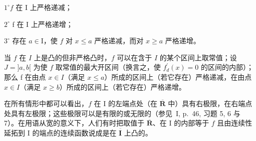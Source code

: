 \(1^{\circ} f\) 在 I 上严格递减；

\(2^{\circ}\) f 在 I 上严格递增；

\(3^{\circ}\) 存在 \(a \in \mathrm{I}\)，使 \(f\) 对 \(x \leqslant a\) 严格递减，而对 \(x \geqslant a\) 严格递增。

当 \(f\) 在 \(I\) 上是凸的但非严格凸时，\(f\) 可以在含于 \(I\) 的某个区间上取常值；设 \(J = ]a, b[\) 为使 \(f\) 取常值的最大开区间（换言之，使 \(f_{d}^{\prime}(x)=0\) 的区间的内部）；那么 f 在由点 \(x\in I\)（满足 \(x\leqslant a\)）所成的区间上（若它存在）严格递减，在由点 \(x\in I\)（满足 \(x\geqslant b\)）所成的区间上（若它存在）严格递增。

在所有情形中都可以看出，\(f\) 在 I 的左端点处（在 \(\overline{\mathbf{R}}\) 中）具有右极限，在右端点处具有左极限；这些极限可以是有限的或无限的（参见~I, p.~46, 习题 5, 6 与 7）。在用语从宽的意义下，人们有时把取值于 \(\overline{\mathbf{R}}\)、在 I 的内部等于 \(f\) 且由连续性延拓到 I 的端点的连续函数说成是在 \(\overline{\mathbf{I}}\) 上凸的。

